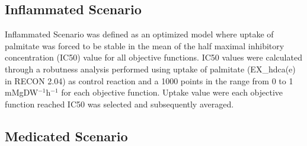 \subsection{Inflammated Scenario}
Inflammated Scenario was defined as an optimized model where uptake of palmitate was forced to be stable in the mean of the half maximal inhibitory concentration (IC50) value for all objective functions. IC50 values were calculated through a robutness analysis performed using uptake of palmitate (EX\_hdca(e) in RECON 2.04) as control reaction and a 1000 points in the range from 0 to 1 mMgDW$^{-1}$h$^{-1}$ for each objective function. Uptake value were each objective function reached IC50 was selected and subsequently averaged.
\subsection{Medicated Scenario}
